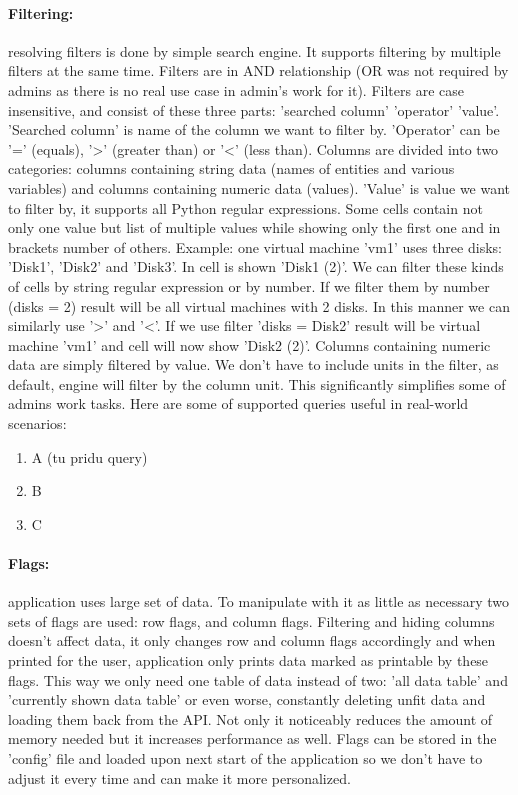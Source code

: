 \paragraph{Filtering:}
resolving filters is done by simple search engine. It supports filtering by multiple filters at the same time. Filters are in AND relationship (OR was not required by admins as there is no real use case in admin's work for it). Filters are case insensitive, and consist of these three parts: 'searched column' 'operator' 'value'. 'Searched column' is name of the column we want to filter by. 'Operator' can be '=' (equals), '>' (greater than) or '<' (less than). Columns are divided into two categories: columns containing string data (names of entities and various variables) and columns containing numeric data (values). 'Value' is value we want to filter by, it supports all Python regular expressions. Some cells contain not only one value but list of multiple values while showing only the first one and in brackets number of others. Example: one virtual machine 'vm1' uses three disks: 'Disk1', 'Disk2' and 'Disk3'. In cell is shown 'Disk1 (2)'. We can filter these kinds of cells by string regular expression or by number. If we filter them by number (disks = 2) result will be all virtual machines with 2 disks. In this manner we can similarly use '>' and '<'.  If we use filter 'disks = Disk2' result will be virtual machine 'vm1' and cell will now show 'Disk2 (2)'. Columns containing numeric data are simply filtered by value. We don't have to include units in the filter, as default, engine will filter by the column unit. This significantly simplifies some of admins work tasks. Here are some of supported queries useful in real-world scenarios:
\begin{enumerate}
\item A (tu pridu query)
\item B
\item C
\end{enumerate}

\paragraph{Flags:}
application uses large set of data. To manipulate with it as little as necessary two sets of flags are used: row flags, and column flags. Filtering and hiding columns doesn't affect data, it only changes row and column flags accordingly and when printed for the user, application only prints data marked as printable by these flags. This way we only need one table of data instead of two: 'all data table' and 'currently shown data table' or even worse, constantly deleting unfit data and loading them back from the API. Not only it noticeably reduces the amount of memory needed but it increases performance as well. Flags can be stored in the 'config' file and loaded upon next start of the application so we don't have to adjust it every time and can make it more personalized.


